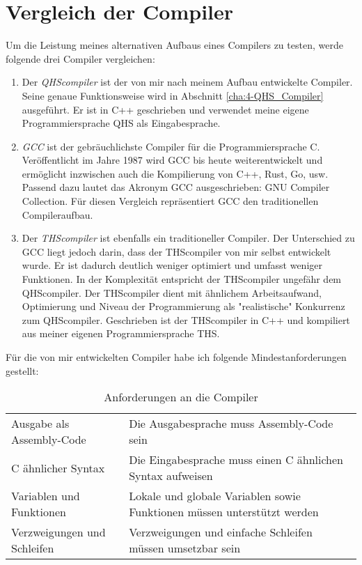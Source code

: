 \chapter{Vergleich der Compiler} \label{cha:2-Vergleich}
Um die Leistung meines alternativen Aufbaus eines Compilers zu testen, werde folgende drei Compiler vergleichen:

\begin{enumerate}
\item
Der \textit{QHScompiler} ist der von mir nach meinem Aufbau entwickelte Compiler. Seine genaue Funktionsweise wird in Abschnitt \ref{cha:4-QHS_Compiler} ausgeführt.
Er ist in C++ geschrieben und verwendet meine eigene Programmiersprache QHS als Eingabesprache. 

\item
\textit{GCC} ist der gebräuchlichste Compiler für die Programmiersprache C. Veröffentlicht im Jahre 1987 wird GCC bis heute weiterentwickelt und ermöglicht inzwischen auch die Kompilierung von C++, Rust, Go, usw.
Passend dazu lautet das Akronym GCC ausgeschrieben: GNU Compiler Collection.
Für diesen Vergleich repräsentiert GCC den traditionellen Compileraufbau.

\item
Der \textit{THScompiler} ist ebenfalls ein traditioneller Compiler. Der Unterschied zu GCC liegt jedoch darin, dass der THScompiler von mir selbst entwickelt wurde. 
Er ist dadurch deutlich weniger optimiert und umfasst weniger Funktionen. In der Komplexität entspricht der THScompiler ungefähr dem QHScompiler.
Der THScompiler dient mit ähnlichem Arbeitsaufwand, Optimierung und Niveau der Programmierung als "realistische" Konkurrenz zum QHScompiler.
Geschrieben ist der THScompiler in C++ und kompiliert aus meiner eigenen Programmiersprache THS.
\end{enumerate}

Für die von mir entwickelten Compiler habe ich folgende Mindestanforderungen gestellt:

\begin{table}[H]
    \centering
    \caption{Anforderungen an die Compiler}
    \label{tab:requirements}
    \vspace{3mm} %
    
    \begin{tabular}{l|l}
    Ausgabe als Assembly-Code       & Die Ausgabesprache muss Assembly-Code sein                               \\
    C ähnlicher Syntax              & Die Eingabesprache muss einen C ähnlichen Syntax aufweisen               \\
    Variablen und Funktionen        & Lokale und globale Variablen sowie Funktionen müssen unterstützt werden  \\
    Verzweigungen und Schleifen     & Verzweigungen und einfache Schleifen müssen umsetzbar sein
    \end{tabular}
\end{table}

